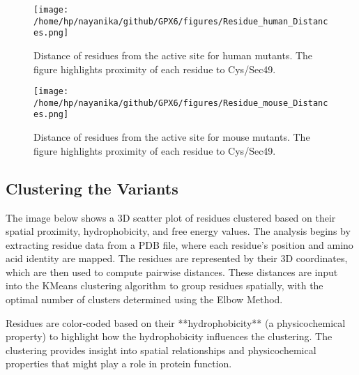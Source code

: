 \documentclass{article}
\begin{document}
\begin{figure}[H]
    \centering
    \texttt{[image: /home/hp/nayanika/github/GPX6/figures/Residue\_human\_Distances.png]} %
    \caption{Distance of residues from the active site for human mutants. The figure highlights proximity of each residue to Cys/Sec49.}
    \label{fig:human_distances}
\end{figure}

\begin{figure}[H]
    \centering
    \texttt{[image: /home/hp/nayanika/github/GPX6/figures/Residue\_mouse\_Distances.png]} %
    \caption{Distance of residues from the active site for mouse mutants. The figure highlights proximity of each residue to Cys/Sec49.}
    \label{fig:mouse_distances}
\end{figure}

\FloatBarrier %

\subsection{Clustering the Variants}

The image below shows a 3D scatter plot of residues clustered based on their spatial proximity, hydrophobicity, and free energy values. The analysis begins by extracting residue data from a PDB file, where each residue’s position and amino acid identity are mapped. The residues are represented by their 3D coordinates, which are then used to compute pairwise distances. These distances are input into the KMeans clustering algorithm to group residues spatially, with the optimal number of clusters determined using the Elbow Method.

Residues are color-coded based on their **hydrophobicity** (a physicochemical property) to highlight how the hydrophobicity influences the clustering. The clustering provides insight into spatial relationships and physicochemical properties that might play a role in protein function.
\end{document}

